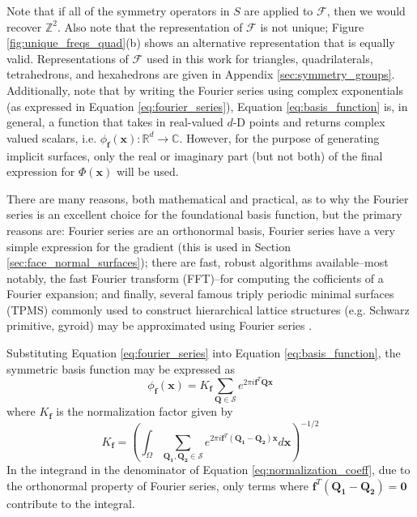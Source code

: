 \documentclass[acmtog]{acmart}
\begin{document}
%
Note that if all of the symmetry operators in $S$ are applied to $\mathcal{F}$, then we would recover $\mathbb{Z}^2$. Also note that the representation of $\mathcal{F}$ is not unique; Figure \ref{fig:unique_freqs_quad}(b) shows an alternative representation that is equally valid. Representations of $\mathcal{F}$ used in this work for triangles, quadrilaterals, tetrahedrons, and hexahedrons are given in Appendix \ref{sec:symmetry_groups}. Additionally, note that by writing the Fourier series using complex exponentials (as expressed in Equation \ref{eq:fourier_series}), Equation \ref{eq:basis_function} is, in general, a function that takes in real-valued $d$-D points and returns complex valued scalars, i.e. $\phi_{\mathbf{f}}(\mathbf{x}): \mathbb{R}^d \rightarrow \mathbb{C}$. However, for the purpose of generating implicit surfaces, only the real or imaginary part (but not both) of the final expression for $\Phi(\mathbf{x})$ will be used.

There are many reasons, both mathematical and practical, as to why the Fourier series is an excellent choice for the foundational basis function, but the primary reasons are: Fourier series are an orthonormal basis, Fourier series have a very simple expression for the gradient (this is used in Section \ref{sec:face_normal_surfaces}); there are fast, robust algorithms available--most notably, the fast Fourier transform (FFT)--for computing the cofficients of a Fourier expansion; and finally, several famous triply periodic minimal surfaces (TPMS) commonly used to construct hierarchical lattice structures (e.g. Schwarz primitive, gyroid) may be approximated using Fourier series \cite{wohlgemuth2001triply}.

Substituting Equation \ref{eq:fourier_series} into Equation \ref{eq:basis_function}, the symmetric basis function may be expressed as
%
\begin{equation}
  \label{eq:basis_function_actual}
  \phi_{\mathbf{f}}(\mathbf{x}) = K_{\mathbf{f}} \sum\limits_{\mathbf{Q} \in \mathcal{S}} e^{2 \pi i \mathbf{f}^T \mathbf{Q} \mathbf{x}}
\end{equation}
%
where $K_{\mathbf{f}}$ is the normalization factor given by
\begin{equation}
  \label{eq:normalization_coeff}
  K_{\mathbf{f}} = \left( \int_{\Omega}{ \sum\limits_{\mathbf{Q_1}, \mathbf{Q_2} \in \mathcal{S}} e^{2 \pi i \mathbf{f}^T (\mathbf{Q_1 - Q_2}) \mathbf{x}} d\mathbf{x} } \right)^{-1/2}
\end{equation}
In the integrand in the denominator of Equation \ref{eq:normalization_coeff}, due to the orthonormal property of Fourier series, only terms where $\mathbf{f}^T \left( \mathbf{Q_1} - \mathbf{Q_2} \right) = \mathbf{0}$ contribute to the integral.
\end{document}
